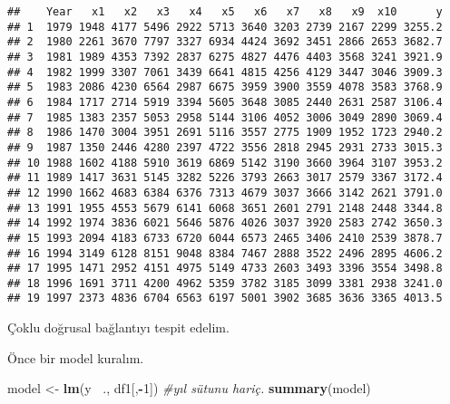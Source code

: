 \documentclass[
]{book}
\newenvironment{Shaded}{\begin{snugshade}}{\end{snugshade}}
\newcommand{\CommentTok}[1]{\textcolor[rgb]{0.56,0.35,0.01}{\textit{#1}}}
\newcommand{\DecValTok}[1]{\textcolor[rgb]{0.00,0.00,0.81}{#1}}
\newcommand{\KeywordTok}[1]{\textcolor[rgb]{0.13,0.29,0.53}{\textbf{#1}}}
\newcommand{\NormalTok}[1]{#1}
\newcommand{\OperatorTok}[1]{\textcolor[rgb]{0.81,0.36,0.00}{\textbf{#1}}}
\newcommand{\StringTok}[1]{\textcolor[rgb]{0.31,0.60,0.02}{#1}}
\begin{document}
\begin{verbatim}
##    Year   x1   x2   x3   x4   x5   x6   x7   x8   x9  x10      y
## 1  1979 1948 4177 5496 2922 5713 3640 3203 2739 2167 2299 3255.2
## 2  1980 2261 3670 7797 3327 6934 4424 3692 3451 2866 2653 3682.7
## 3  1981 1989 4353 7392 2837 6275 4827 4476 4403 3568 3241 3921.9
## 4  1982 1999 3307 7061 3439 6641 4815 4256 4129 3447 3046 3909.3
## 5  1983 2086 4230 6564 2987 6675 3959 3900 3559 4078 3583 3768.9
## 6  1984 1717 2714 5919 3394 5605 3648 3085 2440 2631 2587 3106.4
## 7  1985 1383 2357 5053 2958 5144 3106 4052 3006 3049 2890 3069.4
## 8  1986 1470 3004 3951 2691 5116 3557 2775 1909 1952 1723 2940.2
## 9  1987 1350 2446 4280 2397 4722 3556 2818 2945 2931 2733 3015.3
## 10 1988 1602 4188 5910 3619 6869 5142 3190 3660 3964 3107 3953.2
## 11 1989 1417 3631 5145 3282 5226 3793 2663 3017 2579 3367 3172.4
## 12 1990 1662 4683 6384 6376 7313 4679 3037 3666 3142 2621 3791.0
## 13 1991 1955 4553 5679 6141 6068 3651 2601 2791 2148 2448 3344.8
## 14 1992 1974 3836 6021 5646 5876 4026 3037 3920 2583 2742 3650.3
## 15 1993 2094 4183 6733 6720 6044 6573 2465 3406 2410 2539 3878.7
## 16 1994 3149 6128 8151 9048 8384 7467 2888 3522 2496 2895 4606.2
## 17 1995 1471 2952 4151 4975 5149 4733 2603 3493 3396 3554 3498.8
## 18 1996 1691 3711 4200 4962 5359 3782 3185 3099 3381 2938 3241.0
## 19 1997 2373 4836 6704 6563 6197 5001 3902 3685 3636 3365 4013.5
\end{verbatim}

Çoklu doğrusal bağlantıyı tespit edelim.

Önce bir model kuralım.

\begin{Shaded}
\begin{Highlighting}[]
\NormalTok{model <-}\StringTok{ }\KeywordTok{lm}\NormalTok{(y }\OperatorTok{~}\NormalTok{., df1[,}\OperatorTok{-}\DecValTok{1}\NormalTok{]) }\CommentTok{#yıl sütunu hariç.}
\KeywordTok{summary}\NormalTok{(model)}
\end{Highlighting}
\end{Shaded}
\end{document}
